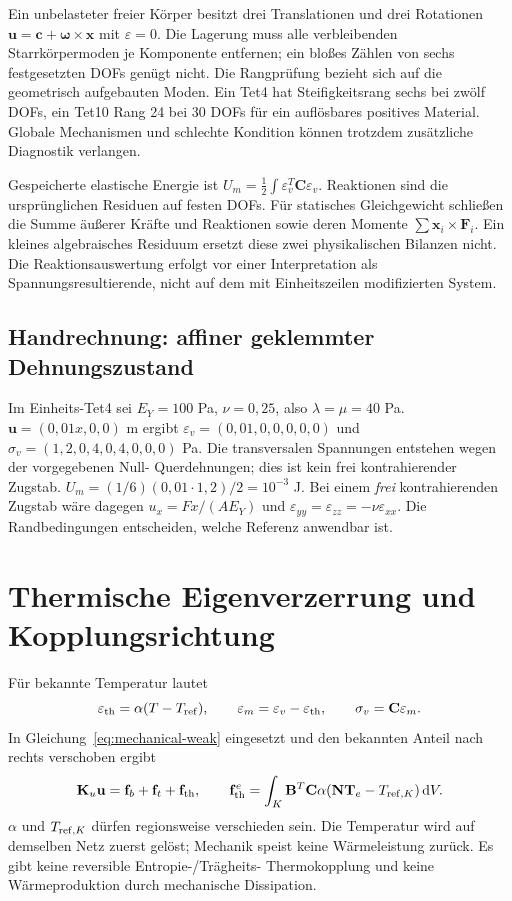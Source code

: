 Ein unbelasteter freier Körper besitzt drei Translationen und drei Rotationen
$\mathbf u=\mathbf c+\boldsymbol\omega\times\mathbf x$ mit $\varepsilon=0$.
Die Lagerung muss alle verbleibenden Starrkörpermoden je Komponente entfernen;
ein bloßes Zählen von sechs festgesetzten DOFs genügt nicht.
Die Rangprüfung bezieht sich auf die geometrisch aufgebauten Moden.
Ein Tet4 hat Steifigkeitsrang sechs bei zwölf DOFs, ein Tet10 Rang 24 bei 30
DOFs für ein auflösbares positives Material. Globale Mechanismen und schlechte
Kondition können trotzdem zusätzliche Diagnostik verlangen.

Gespeicherte elastische Energie ist $U_m=\frac12\int\varepsilon_v^T\mathbf C
\varepsilon_v$. Reaktionen sind die ursprünglichen Residuen auf festen DOFs.
Für statisches Gleichgewicht schließen die Summe äußerer Kräfte und Reaktionen
sowie deren Momente $\sum\mathbf x_i\times\mathbf F_i$.
Ein kleines algebraisches Residuum ersetzt diese zwei physikalischen Bilanzen
nicht. Die Reaktionsauswertung erfolgt vor einer Interpretation als
Spannungsresultierende, nicht auf dem mit Einheitszeilen modifizierten System.

\subsection{Handrechnung: affiner geklemmter Dehnungszustand}
Im Einheits-Tet4 sei $E_Y=100$ Pa, $\nu=0{,}25$, also $\lambda=\mu=40$ Pa.
$\mathbf u=(0{,}01x,0,0)$ m ergibt
$\varepsilon_v=(0{,}01,0,0,0,0,0)$ und
$\sigma_v=(1{,}2,0{,}4,0{,}4,0,0,0)$ Pa.
Die transversalen Spannungen entstehen wegen der vorgegebenen Null-
Querdehnungen; dies ist kein frei kontrahierender Zugstab.
$U_m=(1/6)(0{,}01\cdot1{,}2)/2=10^{-3}$ J.
Bei einem \emph{frei} kontrahierenden Zugstab wäre dagegen
$u_x=Fx/(AE_Y)$ und $\varepsilon_{yy}=\varepsilon_{zz}=-\nu\varepsilon_{xx}$.
Die Randbedingungen entscheiden, welche Referenz anwendbar ist.

\section{Thermische Eigenverzerrung und Kopplungsrichtung}
Für bekannte Temperatur lautet
\begin{equation}\label{eq:thermal-strain}
\varepsilon_{\rm th}=\alpha(T-T_{\rm ref}),\qquad
\varepsilon_m=\varepsilon_v-\varepsilon_{\rm th},\qquad
\sigma_v=\mathbf C\varepsilon_m.
\end{equation}
In Gleichung~\ref{eq:mechanical-weak} eingesetzt und den bekannten Anteil
nach rechts verschoben ergibt
\begin{equation}\label{eq:thermal-load}
\mathbf K_u\mathbf u=\mathbf f_b+\mathbf f_t+\mathbf f_{\rm th},\qquad
\mathbf f_{\rm th}^e=\int_K\mathbf B^T\mathbf C\alpha
(\mathbf N\mathbf T_e-T_{{\rm ref},K})\,\mathrm dV.
\end{equation}
$\alpha$ und $T_{{\rm ref},K}$ dürfen regionsweise verschieden sein. Die
Temperatur wird auf demselben Netz zuerst gelöst; Mechanik speist keine
Wärmeleistung zurück. Es gibt keine reversible Entropie-/Trägheits-
Thermokopplung und keine Wärmeproduktion durch mechanische Dissipation.

